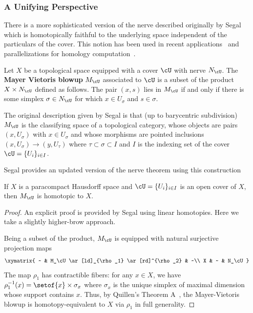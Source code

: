 \subsubsection{A Unifying Perspective}

There is a more sophisticated version of the nerve described originally by Segal~\cite{segal_CSSS} which is homotopically faithful to the underlying space independent of the particulars of the cover. This notion has been used in recent applications~\cite{zomorodian2008localized} and parallelizations for homology computation~\cite{lewis2012multicore}.

\begin{defn}\label{defn:MV_blowup}
Let $X$ be a topological space equipped with a cover $\cU$ with nerve $N_\cU$. The {\bf Mayer Vietoris blowup} $M_\cU$ associated to $\cU$ is a subset of the product $X \times N_\cU$ defined as follows. The pair $(x,s)$ lies in $M_\cU$ if and only if there is some simplex $\sigma \in N_\cU$ for which $x \in U_\sigma$ and $s \in \sigma$.
\end{defn}

\begin{rmk}
The original description given by Segal is that (up to barycentric subdivision) $M_{\cU}$ is the classifying space of a topological category, whose objects are pairs $(x,U_{\sigma})$ with $x\in U_{\sigma}$ and whose morphisms are pointed inclusions $(x,U_{\sigma})\to (y,U_{\tau})$ where $\tau\subset\sigma\subset I$ and $I$ is the indexing set of the cover $\cU=\{U_i\}_{i\in I}$.
\end{rmk}

Segal provides an updated version of the nerve theorem using this construction~\cite[Prop. 4.1]{segal_CSSS}

\begin{lem}\label{lem:generalized_nerve_thm}
	If $X$ is a paracompact Hausdorff space and $\cU=\{U_i\}_{i\in I}$ is an open cover of $X$, then $M_{\cU}$ is homotopic to $X$.
\end{lem}
\begin{proof}
An explicit proof is provided by Segal using linear homotopies. Here we take a slightly higher-brow approach.

Being a subset of the product, $M_\cU$ is equipped with natural surjective projection maps
\[
\xymatrix{ ~ & M_\cU \ar[ld]_{\rho_1} \ar[rd]^{\rho_2} & ~\\
X & ~ & N_\cU}
\]
The map $\rho_1$ has contractible fibers: for any $x \in X$, we have $\rho_1^{-1}(x) = \setof{x} \times \sigma_x$ where $\sigma_x$ is the unique simplex of maximal dimension whose support contains $x$. Thus, by Quillen's Theorem A~\cite{quillen1973higher}, the Mayer-Vietoris blowup is homotopy-equivalent to $X$ via $\rho_1$ in full generality.
\end{proof}

